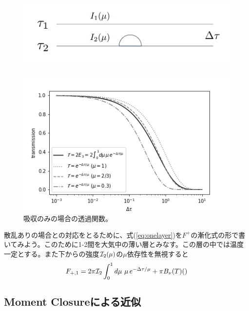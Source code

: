 \begin{figure}[htb]
\begin{center}
\includegraphics[width=\linewidth]{fig/layer1.PNG}
\caption{\label{fig:layer1}}
\end{center}
\end{figure}

\begin{figure}[htb]
\begin{center}
\includegraphics[width=\linewidth]{fig/transrt.PNG}
\caption{吸収のみの場合の透過関数。\label{fig:transrt}}
\end{center}
\end{figure}


散乱ありの場合との対応をとるために、式(\ref{eq:onelayer})を$F^+$の漸化式の形で書いてみよう。このために1-2間を大気中の薄い層とみなす。この層の中では温度一定とする。また下からの強度${\mathcal{I}}_2 (\mu)$の$\mu$依存性を無視すると
\begin{align}
\label{eq:onelayer}
F_{+,1} &= 2 \pi {\mathcal{I}}_2  \int_{0}^1 d\mu \,  \, \mu \, e^{-\Delta \tau/\mu} + \pi B_\nu (T) () \\
\end{align}


\subsection*{Moment Closureによる近似}

